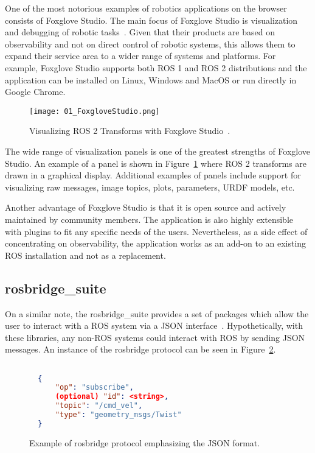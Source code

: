         One of the most notorious examples of robotics applications on the browser consists of Foxglove Studio. The main focus of Foxglove Studio is visualization and debugging of robotic tasks~\cite{foxglove}. Given that their products are based on observability and not on direct control of robotic systems, this allows them to expand their service area to a wider range of systems and platforms. For example, Foxglove Studio supports both \ac{ROS} 1 and \ac{ROS} 2 distributions and the application can be installed on Linux, Windows and MacOS or run directly in Google Chrome.
        
        \begin{figure}[htbp]
            \centering
            \texttt{[image: 01\_FoxgloveStudio.png]}
            \caption{Visualizing ROS 2 Transforms with Foxglove Studio~\cite{transforms}.}
            \label{fig:foxglove}
        \end{figure}

        The wide range of visualization panels is one of the greatest strengths of Foxglove Studio. An example of a panel is shown in Figure~\ref{fig:foxglove} where \ac{ROS} 2 transforms are drawn in a graphical display. Additional examples of panels include support for visualizing raw messages, image topics, plots, parameters, \ac{URDF} models, etc.

        Another advantage of Foxglove Studio is that it is open source and actively maintained by community members. The application is also highly extensible with plugins to fit any specific needs of the users. Nevertheless, as a side effect of concentrating on observability, the application works as an add-on to an existing ROS installation and not as a replacement.

    \subsection{\textsf{rosbridge\_suite}}

        On a similar note, the \textsf{rosbridge\_suite} provides a set of packages which allow the user to interact with a \ac{ROS} system via a \ac{JSON} interface~\cite{rosbridge}. Hypothetically, with these libraries, any non-ROS systems could interact with ROS by sending \ac{JSON} messages. An instance of the \textsf{rosbridge} protocol can be seen in Figure~\ref{fig:rosbridge}.

        \begin{figure}[htbp]
            \centering
            \begin{lstlisting}[language=JSON]

  {
      "op": "subscribe",
      (optional) "id": <string>,
      "topic": "/cmd_vel",
      "type": "geometry_msgs/Twist"
  }
            \end{lstlisting}
            \caption{Example of \textsf{rosbridge} protocol emphasizing the JSON format.}
            \label{fig:rosbridge}
        \end{figure}

